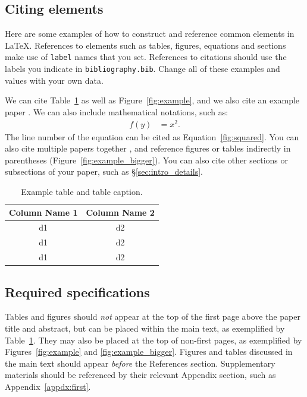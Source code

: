 \documentclass{anthology-ch}         %
\begin{document}
\subsection{Citing elements}

Here are some examples of how to construct and reference common elements in LaTeX. References to elements such as tables, figures, equations and sections make use of \texttt{label} names that you set. References to citations should use the labels you indicate in \texttt{bibliography.bib}. Change all of these examples and values with your own data. 

We can cite Table~\ref{tab:example} as well as Figure~\ref{fig:example}, and we also cite an example paper \cite{tettoni2024discoverability}.
We can also include mathematical notations, such as:
\begin{align}
f(y) &= x^2. \label{fig:squared}
\end{align}
The line number of the equation can be cited as
Equation~\ref{fig:squared}. You can also cite multiple papers together \cite{barré2024latent, levenson2024textual, bambaci2024steps}, and reference figures or tables indirectly in parentheses (Figure~\ref{fig:example_bigger}). You can also cite other sections or subsections of your paper, such as \S\ref{sec:intro_details}. 


\begin{table}[h]
  \centering 
  \begin{tabular}{cc}
    \toprule
    Column Name 1 & Column Name 2\\
    \midrule
    d1 & d2 \\
    d1 & d2 \\
    d1 & d2 \\
    \bottomrule
  \end{tabular}
  \caption{Example table and table caption.}
  \label{tab:example}
\end{table}


\subsection{Required specifications}

Tables and figures should \textit{not} appear at the top of the first page above the paper title and abstract, but can be placed within the main text, as exemplified by Table~\ref{tab:example}. They may also be placed at the top of non-first pages, as exemplified by Figures~\ref{fig:example} and \ref{fig:example_bigger}. Figures and tables discussed in the main text should appear \textit{before} the References section. Supplementary materials should be referenced by their relevant Appendix section, such as Appendix~\ref{appdx:first}. 
\end{document}
